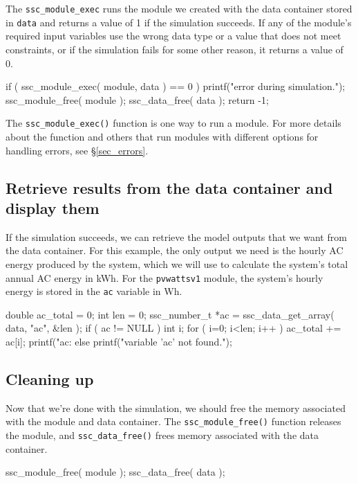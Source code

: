 \documentclass{scrartcl} %
\begin{document}
The \texttt{ssc\_module\_exec} runs the module we created with the data container stored in \texttt{data} and returns a value of 1 if the simulation succeeds. If any of the module's required input variables use the wrong data type or a value that does not meet constraints, or if the simulation fails for some other reason, it returns a value of 0.

\begin{verbatimtab}[4]
	if ( ssc_module_exec( module, data ) == 0 )
	{
		printf("error during simulation.\n");
		ssc_module_free( module );
		ssc_data_free( data );
		return -1;
	}
\end{verbatimtab}

The \texttt{ssc\_module\_exec()} function is one way to run a module. For more details about the function and others that run modules with different options for handling errors, see \S\ref{sec_errors}.

\subsection{Retrieve results from the data container and display them}

If the simulation succeeds, we can retrieve the model outputs that we want from the data container. For this example, the only output we need is the hourly AC energy produced by the system, which we will use to calculate the system's total annual AC energy in kWh. For the \texttt{pvwattsv1} module, the system's hourly energy is stored in the \texttt{ac} variable in Wh.

\begin{verbatimtab}[4]
	double ac_total = 0;
	int len = 0;
	ssc_number_t *ac = ssc_data_get_array( data, "ac", &len );
	if ( ac != NULL )
	{
		int i;
		for ( i=0; i<len; i++ )
			ac_total += ac[i];
		printf("ac: %
	}
	else
	{
		printf("variable 'ac' not found.\n");
	}
\end{verbatimtab}

\subsection{Cleaning up}

Now that we're done with the simulation, we should free the memory associated with the module and data container. The \texttt{ssc\_module\_free()} function releases the module, and \texttt{ssc\_data\_free()} frees memory associated with the data container. 

\begin{verbatimtab}	
	ssc_module_free( module );
	ssc_data_free( data );
\end{verbatimtab}
\end{document}
